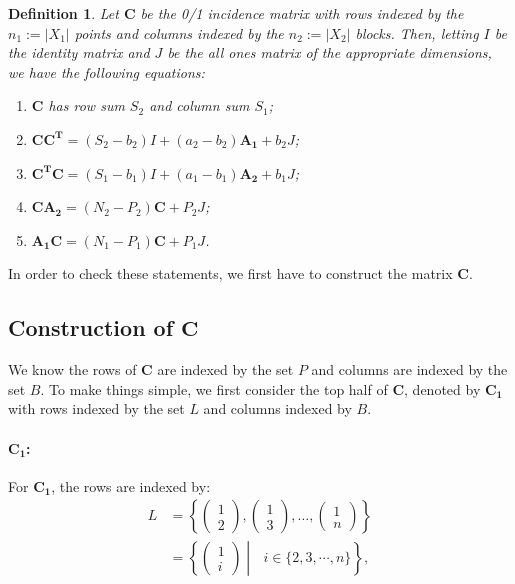 \documentclass{article}
\newtheorem{definition}{Definition}
\begin{document}
\begin{definition}
    Let \(\mathbf{C}\) be the 0/1 incidence matrix with rows indexed by the \(n_1 := |X_1|\) points and columns indexed by the \(n_2 := |X_2|\) blocks. Then, letting \(I\) be the identity matrix and \(J\) be the all ones matrix of the appropriate dimensions, we have the following equations:
    \begin{enumerate}
        \item \(\mathbf{C}\) has row sum \(S_2\) and column sum \(S_1\);
        \item \(\mathbf{CC^T} = (S_2-b_2)I + (a_2 - b_2)\mathbf{A_1} +b_2J\);
        \item \(\mathbf{C^T C} = (S_1-b_1)I + (a_1-b_1)\mathbf{A_2}+b_1J\);
        \item \(\mathbf{CA_2} = (N_2-P_2)\mathbf{C}+P_2J\);
        \item \(\mathbf{A_1C} = (N_1-P_1)\mathbf{C}+P_1J\).
    \end{enumerate}
\end{definition}

In order to check these statements, we first have to construct the matrix \(\mathbf{C}\).

\subsection{Construction of \( \mathbf{C} \)}
We know the rows of \(\mathbf{C}\) are indexed by the set \(P\) and columns are indexed by the set \(B\). To make things simple, we first consider the top half of \(\mathbf{C}\), denoted by \(\mathbf{C_1}\) with rows indexed by the set \(L\) and columns indexed by \(B\).

\paragraph{\( \mathbf{C_1} \):}

For \( \mathbf{C_1} \), the rows are indexed by:
\begin{align*}
    L &= \left\{\begin{pmatrix} 1 \\ 2 \end{pmatrix}, \begin{pmatrix} 1 \\ 3 \end{pmatrix}, \dots, \begin{pmatrix} 1 \\ n \end{pmatrix}\right\} \\
    &= \left\{ \begin{pmatrix}1 \\ i\end{pmatrix}\middle|\text{ }i\in\{2,3,\cdots,n\}\right\},
\end{align*}
\end{document}
